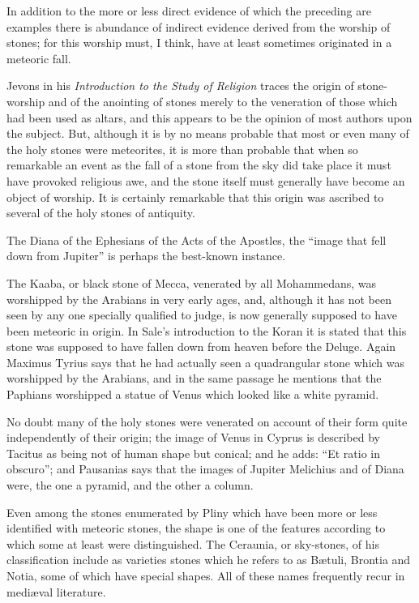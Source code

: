 \documentclass[a4paper, 12pt, oneside]{article}
\begin{document}
In addition to the more or less direct evidence of which the preceding are examples there is abundance of indirect evidence derived from the worship of stones; for this worship must, I think, have at least sometimes originated in a meteoric fall. 

Jevons in his \emph{Introduction to the Study of Religion} traces the origin of stone-worship and of the anointing of stones merely to the veneration of those which had been used as altars, and this appears to be the opinion of most authors upon the subject. But, although it is by no means probable that most or even many of the holy stones were meteorites, it is more than probable that when so remarkable an event as the fall of a stone from the sky did take place it must have provoked religious awe, and the stone itself must generally have become an object of worship. It is certainly remarkable that this origin was ascribed to several of the holy stones of antiquity. 

The Diana of the Ephesians of the Acts of the Apostles, the ``image that fell down from Jupiter'' is perhaps the best-known instance. 

The Kaaba, or black stone of Mecca, venerated by all Mohammedans, was worshipped by the Arabians in very early ages, and, although it has not been seen by any one specially qualified to judge, is now generally supposed to have been meteoric in origin. In Sale's introduction to the Koran it is stated that this stone was supposed to have fallen down from heaven before the Deluge. Again Maximus Tyrius says that he had actually seen a quadrangular stone which was worshipped by the Arabians, and in the same passage he mentions that the Paphians worshipped a statue of Venus which looked like a white pyramid. 

No doubt many of the holy stones were venerated on account of their form quite independently of their origin; the image of Venus in Cyprus is described by Tacitus as being not of human shape but conical; and he adds: ``Et ratio in obscuro''; and Pausanias says that the images of Jupiter Melichius and of Diana were, the one a pyramid, and the other a column. 

Even among the stones enumerated by Pliny which have been more or less identified with meteoric stones, the shape is one of the features according to which some at least were distinguished. The Ceraunia, or sky-stones, of his classification include as varieties stones which he refers to as Bætuli, Brontia and Notia, some of which have special shapes. All of these names frequently recur in mediæval literature. 
\end{document}
